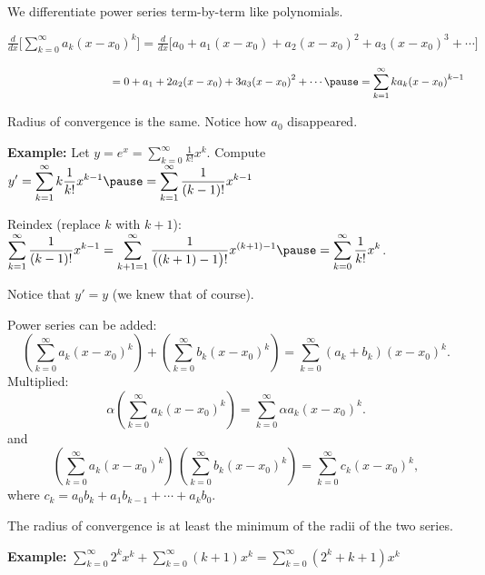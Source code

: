 \documentclass[10pt,aspectratio=169]{beamer}
\begin{document}
\begin{frame}

We differentiate power series term-by-term like polynomials.

\medskip

$
\displaystyle
\frac{d}{dx}
\Biggl[\sum_{k=0}^\infty a_k {(x-x_0)}^k\Biggr]
=
\frac{d}{dx}
\Biggl[
a_0
+ a_1 (x-x_0)
+ a_2 {(x-x_0)}^2
+ a_3 {(x-x_0)}^{3}
+ \cdots
\Biggr]
$

\pause
$
\displaystyle
\phantom{
\frac{d}{dx}
\Biggl[\sum_{k=0}^\infty a_k {(x-x_0)}^k\Biggr]
}
=
0
+
a_1
+ 2 a_2 (x-x_0)
+ 3 a_3 {(x-x_0)}^{2}
+ \cdots
\pause
=
\sum_{k=1}^\infty k a_k {(x-x_0)}^{k-1}
$

\pause
\medskip

Radius of convergence is the same.
\pause
\quad
Notice how $a_0$ disappeared.

\pause
\medskip

\textbf{Example:}
Let $\displaystyle y = e^x = 
\sum_{k=0}^\infty \frac{1}{k!} x^k$.
\quad
\pause
Compute
\quad
$\displaystyle
y' = \sum_{k=1}^\infty k \frac{1}{k!} x^{k-1}
\pause
=
\sum_{k=1}^\infty \frac{1}{(k-1)!} x^{k-1}$

\pause
\medskip

Reindex (replace $k$ with $k+1$):
\quad
$\displaystyle
\sum_{k=1}^\infty \frac{1}{(k-1)!} x^{k-1} =
\sum_{k+1=1}^\infty \frac{1}{\bigl((k+1)-1\bigr)!} x^{(k+1)-1}
\pause
=
\sum_{k=0}^\infty \frac{1}{k!} x^k$.

\pause
\medskip

Notice that $y' = y$ (we knew that of course).

\end{frame}

\begin{frame}
Power series can be added:
\[
\left(\sum_{k=0}^\infty a_k {(x-x_0)}^k\right)
+
\left(\sum_{k=0}^\infty b_k {(x-x_0)}^k\right)
=
\sum_{k=0}^\infty (a_k+b_k) {(x-x_0)}^k .
\]
\pause
Multiplied:
\[
\alpha
\left(\sum_{k=0}^\infty a_k {(x-x_0)}^k\right)
=
\sum_{k=0}^\infty \alpha a_k {(x-x_0)}^k .
\]
\pause
and
\[
\left(\sum_{k=0}^\infty a_k {(x-x_0)}^k\right)
\,
\left(\sum_{k=0}^\infty b_k {(x-x_0)}^k\right)
=
\sum_{k=0}^\infty c_k {(x-x_0)}^k ,
\]
where
$c_k = a_0b_k + a_1 b_{k-1} + \cdots + a_k b_0$.

\pause
\medskip

The radius of convergence 
is at least the minimum of the radii of the two series.

\pause
\medskip

\textbf{Example:}
\quad
$\displaystyle \sum_{k=0}^\infty 2^k x^k + 
\sum_{k=0}^\infty (k+1) x^k = 
\sum_{k=0}^\infty (2^k + k + 1) x^k$

\end{frame}
\end{document}
